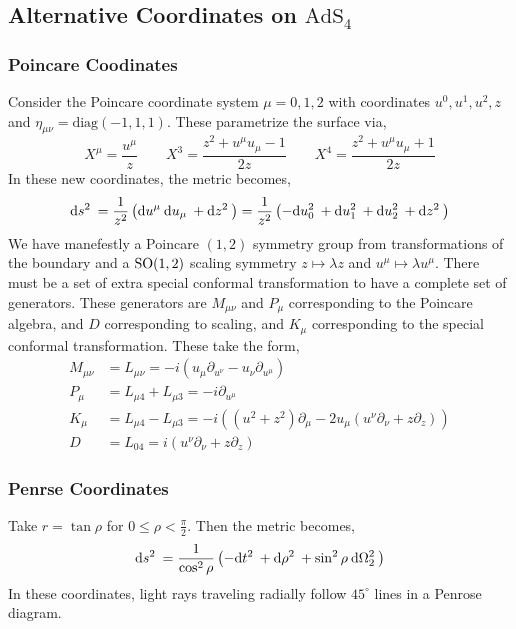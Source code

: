 \documentclass[12pt]{extarticle}
\newcommand{\AdS}[1]{\mathrm{AdS}_{#1}}
\begin{document}
\subsection{Alternative Coordinates on $\AdS{4}$}

\subsubsection{Poincare Coodinates}

Consider the Poincare coordinate system $\mu = 0,1,2$ with coordinates $u^0, u^1, u^2, z$ and $\eta_{\mu \nu} = \mathrm{diag}(-1,1,1)$. These parametrize the surface via,
\[ X^\mu = \frac{u^\mu}{z} \quad \quad X^3  = \frac{z^2 + u^\mu u_\mu - 1}{2 z} \quad \quad X^4 = \frac{z^2 + u^\mu u_\mu + 1}{2 z} \]
In these new coordinates, the metric becomes,
\[ \mathrm{d}s^2 \: = \frac{1}{z^2} \left( \mathrm{d}u^\mu \: \mathrm{d}u_\mu \: + \mathrm{d}z^2 \: \right) = \frac{1}{z^2} \left( -\mathrm{d}u_0^2 \: + \mathrm{d}u_1^2 \: + \mathrm{d}u_2^2 \: + \mathrm{d}z^2 \: \right) \]
We have manefestly a Poincare $(1, 2)$ symmetry group from transformations of the boundary and a $\mathrm{SO}(1, 2)$ scaling symmetry $z \mapsto \lambda z$ and $u^\mu \mapsto \lambda u^\mu$. There must be a set of extra special conformal transformation to have a complete set of generators. These generators are $M_{\mu \nu}$ and $P_\mu$ corresponding to the Poincare algebra, and $D$ corresponding to scaling, and $K_\mu$ corresponding to the special conformal transformation. These take the form,
\begin{align*}
M_{\mu \nu} & = L_{\mu \nu} = - i \left( u_\mu \partial_{u^\nu} - u_{\nu} \partial_{u^\mu} \right) 
\\
P_\mu & = L_{\mu 4} + L_{\mu 3} = - i \partial_{u^\mu} 
\\
K_\mu & = L_{\mu 4} - L_{\mu 3} = - i \left( (u^2 + z^2) \partial_\mu - 2 u_\mu (u^\nu \partial_\nu + z \partial_z) \right) 
\\
D & = L_{04} = i (u^\nu \partial_\nu + z \partial_z )   
\end{align*}

\subsubsection{Penrse Coordinates}

Take $r = \tan{\rho}$ for $0 \le \rho < \frac{\pi}{2}$. Then the metric becomes,
\[ \mathrm{d}s^2 \: = \frac{1}{\cos^2{\rho}} \left( - \mathrm{d}t^2 \: + \mathrm{d}\rho^2 \: + \sin^2{\rho} \: \mathrm{d}\Omega_2^2 \: \right) \]
In these coordinates, light rays traveling radially follow $45^\circ$ lines in a Penrose diagram. 
\end{document}
